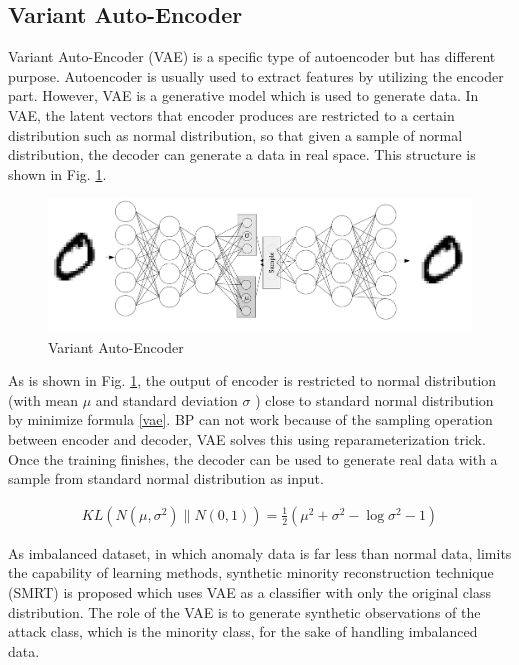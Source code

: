\documentclass[conference]{IEEEtran}
\begin{document}
\subsection{Variant Auto-Encoder}
\label{sec:vae}
Variant Auto-Encoder (VAE) is a specific type of autoencoder but has different purpose. Autoencoder is usually used to extract features by utilizing the encoder part. However, VAE is a generative model which is used to generate data. In VAE, the latent vectors that encoder produces are restricted to a certain distribution such as normal distribution, so that given a sample of normal distribution, the decoder can generate a data in real space. This structure is shown in Fig. \ref{fig:vae}.


\begin{figure}[ht]
\centering
\includegraphics[scale=0.14]{pictures/VAE.png}
\caption{Variant Auto-Encoder}
\label{fig:vae}
\end{figure}

As is shown in Fig. \ref{fig:vae}, the output of encoder is restricted to normal distribution (with mean $\mu$ and standard deviation $\sigma$ ) close to standard normal distribution by minimize formula \ref{vae}. BP can not work because of the sampling operation between encoder and decoder, VAE solves this using reparameterization trick. Once the training finishes, the decoder can be used to generate real data with a sample from standard normal distribution as input.

\begin{equation}
\begin{aligned}
\label{vae}
    K L\left(N\left(\mu, \sigma^{2}\right) \| N(0,1)\right)= \frac{1}{2}\left(\mu^{2}+\sigma^{2}-\log\sigma^{2}-1\right)
\end{aligned}
\end{equation}

As imbalanced dataset, in which anomaly data is far less than normal data, limits the capability of learning methods, synthetic minority reconstruction technique (SMRT) is proposed which uses VAE as a classifier with only the original class distribution. The role of the VAE is to generate synthetic observations of the attack class, which is the minority class, for the sake of handling imbalanced data.
\end{document}
